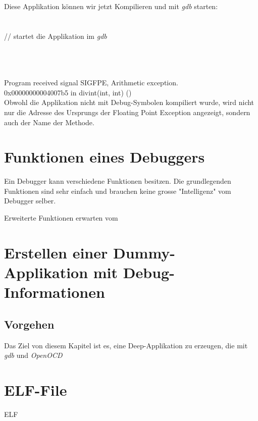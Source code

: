 Diese Applikation können wir jetzt Kompilieren und mit \textit{gdb} starten:\\
\\
\\
        // startet die Applikation im \textit{gdb}

\\
\\
\\
Program received signal SIGFPE, Arithmetic exception.\\
0x00000000004007b5 in divint(int, int) ()\\



Obwohl die Applikation nicht mit Debug-Symbolen kompiliert wurde, wird nicht nur die Adresse des Ursprungs der Floating Point Exception angezeigt, sondern auch der Name der Methode.






\section{Funktionen eines Debuggers}
Ein Debugger kann verschiedene Funktionen besitzen.
Die grundlegenden Funktionen sind sehr einfach und brauchen keine grosse "Intelligenz" vom Debugger selber.

Erweiterte Funktionen erwarten vom

\section{Erstellen einer Dummy-Applikation mit Debug-Informationen}
\subsection{Vorgehen}
Das Ziel von diesem Kapitel ist es, eine Deep-Applikation zu erzeugen, die mit \textit{gdb} und \textit{OpenOCD} %





\section{ELF-File}
ELF 







